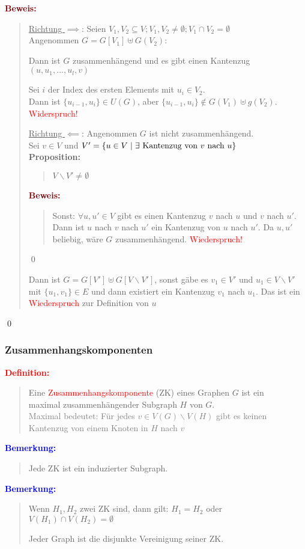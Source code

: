 \documentclass{article}
\newcommand{\smsp}{\phantom{\hspace{3px}}}
\newcommand{\red}[1]{\textcolor{red}{#1}}
\newcommand{\gray}[1]{\textcolor{gray}{#1}}
\newcommand{\blue}[1]{\textcolor{blue}{#1}}
\newcommand{\dgr}[1]{\textcolor{dgr}{#1}}
\newcommand{\maroon}[1]{\textcolor{maroon}{#1}}
\newcommand{\de}[1]{\red{\textbf{Definition: }}\begin{quote}#1\end{quote}}
\newcommand{\an}[1]{\blue{\textbf{Bemerkung: }}\begin{quote}#1\end{quote}}
\newcommand{\prop}[1]{\dgr{\textbf{Proposition: }}\begin{quote}#1\end{quote}}
\newcommand{\pr}[1]{\maroon{\textbf{Beweis: }}\begin{quote}#1\end{quote}\qed}
\renewcommand{\st}{\smsp | \smsp}
\begin{document}
\pr{
    \underline{Richtung $\implies$}: Seien $V_1, V_2 \subseteq V; V_1,V_2 \ne \emptyset; V_1 \cap V_2 = \emptyset$\\
    Angenommen $G = G[V_1] \uplus G(V_2)$:

    Dann ist $G$ zusammenhängend und es gibt einen Kantenzug\\
    $(u,u_1,...,u_l,v)$

    Sei $i$ der Index des ersten Elements mit $u_i \in V_2$.\\
    Dann ist $\{u_{i-1},u_i\} \in U(G)$, aber $\{u_{i-1}, u_i\} \notin G(V_1) \uplus g(V_2)$.\\
    \red{Widerspruch!}

    \underline{Richtung $\impliedby$}: Angenommen $G$ ist nicht zusammenhängend.\\
    Sei $v \in V$ und $V' = \{u \in V \st \exists \text{ Kantenzug von $v$ nach $u$}\}$\\
    \prop{
        $V \backslash V' \ne \emptyset$
    }
    \pr{
        Sonst: $\forall u, u' \in V$ gibt es einen Kantenzug $v$ nach $u$ und $v$ nach $u'$. Dann ist $u$ nach $v$ nach $u'$ ein Kantenzug von $u$ nach $u'$. Da $u, u'$ beliebig, wäre $G$ zusammenhängend. \red{Wiederspruch!}
    }

    Dann ist $G = G[V'] \uplus G[V \backslash V']$, sonst gäbe es $v_1 \in V'$ und $u_1 \in V \backslash V'$ mit $\{u_1,v_1\} \in E$ und dann existiert ein Kantenzug $v_1$ nach $u_1$. Das ist ein \red{Wiederspruch} zur Definition von $u$
}

\subsubsection{Zusammenhangskomponenten}

\de{
    Eine \red{Zusammenhangskomponente} (ZK) eines Graphen $G$ ist ein\\
    maximal zusammenhängender Subgraph $H$ von $G$.\\
    \gray{Maximal bedeutet: Für jedes $v \in V(G) \backslash V(H)$ gibt es keinen\\
    Kantenzug von einem Knoten in $H$ nach $v$}
}

\newpage
\an{
    Jede ZK ist ein induzierter Subgraph.
}

\an{
    Wenn $H_1, H_2$ zwei ZK sind, dann gilt: $H_1 = H_2$ oder\\
    $V(H_1) \cap V(H_2) = \emptyset$

    Jeder Graph ist die disjunkte Vereinigung seiner ZK.
}
\end{document}

